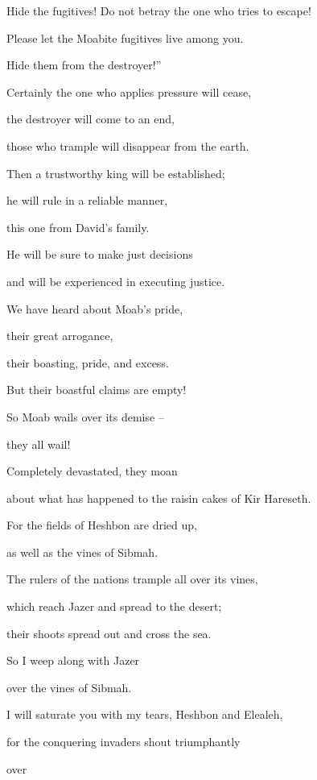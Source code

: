{\par }{\Q Hide
the fugitives! Do not
betray
the one who tries to escape!
\par }{\Q {}Please let the Moabite
fugitives
live
among you.
\par }{\Q Hide
them
from
the destroyer!”
\par }{\Q Certainly the one who applies pressure
will cease,
\par }{\Q the destroyer
will come to an end,
\par }{\Q those who trample
will disappear
from
the earth.
\par }{\Q {}Then a trustworthy
king
will be established;
\par }{\Q he will rule
in
a reliable manner,
\par }{\Q this one from David’s
family.
\par }{\Q He will be sure
to make
just decisions
\par }{\Q and will be experienced
in executing justice.
\par }{\Q {}We have heard
about Moab’s
pride,
\par }{\Q their great
arrogance,
\par }{\Q their boasting,
pride,
and excess.
\par }{\Q But their boastful claims are empty!
\par }{\Q {}So
Moab
wails over its demise –
\par }{\Q they all wail!
\par }{\Q Completely devastated, they moan
\par }{\Q about what has happened to the raisin cakes of Kir Hareseth.
\par }{\Q {}For
the fields
of Heshbon
are dried up,
\par }{\Q as well as the vines
of Sibmah.
\par }{\Q The rulers
of the nations
trample
all over
its vines,
\par }{\Q which reach
Jazer
and spread
to the desert;
\par }{\Q their shoots
spread out
and cross
the sea.
\par }{\Q {}So
I weep
along with
Jazer
\par }{\Q over the vines
of Sibmah.
\par }{\Q I will saturate
you with my tears,
Heshbon
and Elealeh,
\par }{\Q for
the conquering invaders shout triumphantly
\par }{\Q over
}
